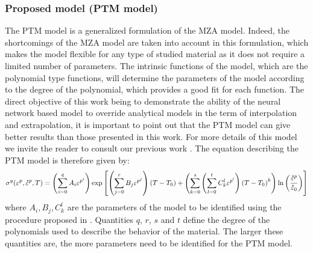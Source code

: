 \documentclass[twoside,english,1p,final,sort&compress]{elsarticle}
\theoremstyle{plain}
\newcommand{\mdot}[1]{\accentset{\mbox{\bfseries .}}{#1}}
\begin{document}
\subsubsection{Proposed model (PTM model)\label{sec:ProposedModel}}
The PTM model is a generalized formulation of the MZA model. Indeed, the shortcomings of the MZA model are taken into account in this formulation, which makes the model flexible for any type of studied material as it does not require a limited number of parameters. The intrinsic functions of the model, which are the polynomial type functions, will determine the parameters of the model according to the degree of the polynomial, which provides a good fit for each function. The direct objective of this work being to demonstrate the ability of the neural network based model to override analytical models in the term of interpolation and extrapolation, it is important to point out that the PTM model can give better results than those presented in this work. For more details of this model we invite the reader to consult our previous work \cite{tize2022generalized}. The equation describing the PTM model is therefore given by:
\begin{equation}
\label{eq:PTM-model}
\sigma^y(\varepsilon^p,\mdot{\varepsilon}^p,T) = \left(\sum_{i=0}^{q}{A_i\varepsilon^{p^i}}\right) \exp\left[\left(\sum_{j=0}^{r}{B_j\varepsilon^{p^j}}\right)\left(T-T_0\right) + \left(\sum_{k=0}^{s}\left(\sum_{l=0}^{t}{C_k^l\varepsilon^{p^l}} \right)\left(T-T_0\right)^k \right)\ln\left( \frac{\mdot{\varepsilon}^p}{\mdot{\varepsilon}_0}\right)\right]
\end{equation}
where $A_i, B_j, C_k^l$ are the parameters of the model to be identified using the procedure proposed in  \cite{tize2022generalized}. Quantities $q$, $r$, $s$ and $t$ define the degree of the polynomials used to describe the behavior of the material. The larger these quantities are, the more parameters need to be identified for the PTM model.
\end{document}
